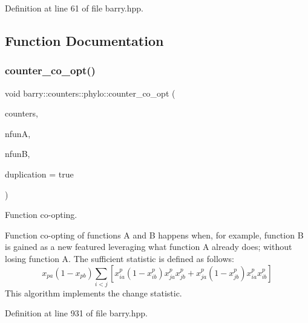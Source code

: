 Definition at line 61 of file barry.\+hpp.



\subsection{Function Documentation}
\mbox{\label{namespacebarry_1_1counters_1_1phylo_adca76f02679f5f1bad46c9fa0ed68553}} 
\subsubsection{\texorpdfstring{counter\+\_\+co\+\_\+opt()}{counter\_co\_opt()}}
{\footnotesize\ttfamily void barry\+::counters\+::phylo\+::counter\+\_\+co\+\_\+opt (\begin{DoxyParamCaption}\item[{\hyperlink{namespacebarry_1_1counters_1_1phylo_a4e401ffe66d04091343dcffaf915f8c3}{Phylo\+Counters} $\ast$}]{counters,  }\item[{\hyperlink{namespacebarry_a11dfc53ddb4672278319aa04f1e09a6c}{uint}}]{nfunA,  }\item[{\hyperlink{namespacebarry_a11dfc53ddb4672278319aa04f1e09a6c}{uint}}]{nfunB,  }\item[{bool}]{duplication = {\ttfamily true} }\end{DoxyParamCaption})\hspace{0.3cm}{\ttfamily [inline]}}



Function co-\/opting. 

Function co-\/opting of functions A and B happens when, for example, function B is gained as a new featured leveraging what function A already does; without losing function A. The sufficient statistic is defined as follows\+: \[ x_{pa}(1 - x_{pb})\sum_{i<j}\left[x_{ia}^p(1 - x_{ib}^p)x_{ja}^px_{jb}^p + x_{ja}^p(1 - x_{jb}^p)x_{ia}^px_{ib}^p\right] \] This algorithm implements the change statistic. 

Definition at line 931 of file barry.\+hpp.

\mbox{\label{namespacebarry_1_1counters_1_1phylo_a002286f13261eb4633c6dc9e6fc1212b}} 
